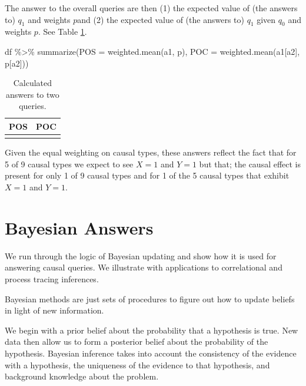\documentclass[
  12pt,
]{book}
\newenvironment{Shaded}{\begin{snugshade}}{\end{snugshade}}
\newcommand{\AttributeTok}[1]{\textcolor[rgb]{0.77,0.63,0.00}{#1}}
\newcommand{\FunctionTok}[1]{\textcolor[rgb]{0.00,0.00,0.00}{#1}}
\newcommand{\NormalTok}[1]{#1}
\newcommand{\SpecialCharTok}[1]{\textcolor[rgb]{0.00,0.00,0.00}{#1}}
\newenvironment{headerbox}{
  \definecolor{shadecolor}{rgb}{0.8, 0.8, 0.8}  %
  \color{black}
  \begin{shaded}}{\end{shaded}}
\begin{document}
The answer to the overall queries are then (1) the expected value of (the answers to) \(q_1\) and weights \(p\)and (2) the expected value of (the answers to) \(q_1\) given \(q_0\) and weights \(p\). See Table \ref{tab:ch4pospoc}.

\begin{Shaded}
\begin{Highlighting}[]
\NormalTok{df }\SpecialCharTok{\%\textgreater{}\%} \FunctionTok{summarize}\NormalTok{(}\AttributeTok{POS =} \FunctionTok{weighted.mean}\NormalTok{(a1, p),}
                 \AttributeTok{POC =} \FunctionTok{weighted.mean}\NormalTok{(a1[a2], p[a2]))}
\end{Highlighting}
\end{Shaded}

\begin{table}

\caption{\label{tab:ch4pospoc}Calculated answers to two queries.}
\centering
\begin{tabular}[t]{rr}
\toprule
POS & POC\\
\midrule
\cellcolor{gray!6}{0.111} & \cellcolor{gray!6}{0.2}\\
\bottomrule
\end{tabular}
\end{table}

Given the equal weighting on causal types, these answers reflect the fact that for 5 of 9 causal types we expect to see \(X=1\) and \(Y=1\) but that; the causal effect is present for only 1 of 9 causal types and for 1 of the 5 causal types that exhibit \(X=1\) and \(Y=1\).

\hypertarget{bayeschapter}{%
\chapter{Bayesian Answers}\label{bayeschapter}}

\begin{headerbox}
We run through the logic of Bayesian updating and show how it is used for answering causal queries. We illustrate with applications to correlational and process tracing inferences.

\end{headerbox}

Bayesian methods are just sets of procedures to figure out how to update beliefs in light of new information.

We begin with a prior belief about the probability that a hypothesis is true. New data then allow us to form a posterior belief about the probability of the hypothesis. Bayesian inference takes into account the consistency of the evidence with a hypothesis, the uniqueness of the evidence to that hypothesis, and background knowledge about the problem.
\end{document}
